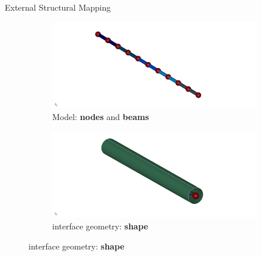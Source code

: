 \documentclass[10pt,t]{beamer}
\begin{document}
\begin{frame}{External Structural Mapping}

\begin{figure}
  \begin{subfigure}[t]{.486\textwidth}
    \centering
    \includegraphics[width=\linewidth]{images/beams_1a.png}
    \caption{Model: \textbf{nodes} and \textbf{beams}}
  \end{subfigure}
  \hfill
  \begin{subfigure}[t]{.486\textwidth}
    \centering
    \includegraphics[width=\linewidth]{images/interf_1a.png}
    \caption{interface geometry: \textbf{shape}}
  \end{subfigure}

  \bigskip


\end{figure}
\end{frame}
\end{document}
